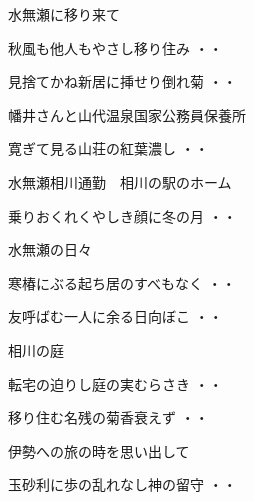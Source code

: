 水無瀬に移り来て
\begin{shiika}秋風も他人もやさし移り住み
\hfill{・・}\end{shiika}
\begin{shiika}見捨てかね新居に挿せり倒れ菊
\hfill{・・}\end{shiika}
\vspace{ 0.4cm}
幡井さんと山代温泉国家公務員保養所
\begin{shiika}寛ぎて見る山荘の紅葉濃し
\hfill{・・}\end{shiika}
\vspace{ 0.4cm}
水無瀬相川通勤　相川の駅のホーム
\begin{shiika}乗りおくれくやしき顔に冬の月
\hfill{・・}\end{shiika}
\vspace{ 0.4cm}
水無瀬の日々
\begin{shiika}寒椿にぶる起ち居のすべもなく
\hfill{・・}\end{shiika}
\vspace{ 0.4cm}
\begin{shiika}友呼ばむ一人に余る日向ぼこ
\hfill{・・}\end{shiika}
\newpage\newpage
\vspace{ 0.4cm}
相川の庭
\begin{shiika}転宅の迫りし庭の実むらさき
\hfill{・・}\end{shiika}
\begin{shiika}移り住む名残の菊香衰えず
\hfill{・・}\end{shiika}
\vspace{ 0.4cm}
伊勢への旅の時を思い出して
\begin{shiika}玉砂利に歩の乱れなし神の留守
\hfill{・・}\end{shiika}
\vspace{ 0.4cm}

